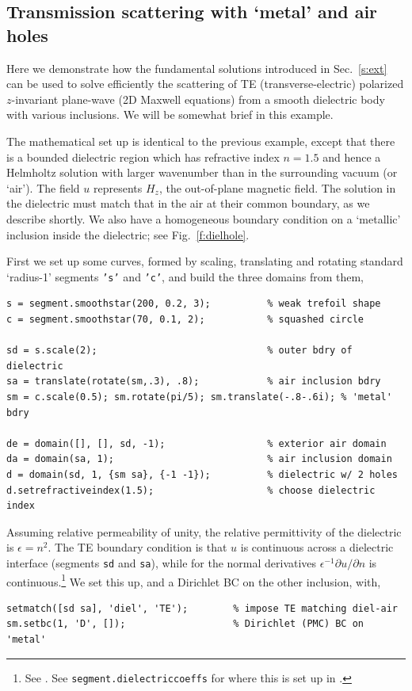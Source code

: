 \subsection{Transmission scattering with `metal' and air holes}
\label{s:dielhole}

Here we demonstrate how the fundamental solutions introduced in
Sec.~\ref{s:ext} can be used to solve efficiently
the scattering of TE (transverse-electric) polarized $z$-invariant
plane-wave (2D Maxwell equations) from a smooth dielectric body with various
inclusions. We will be somewhat brief in this example.

The mathematical set up is identical to the previous example, except that
there is a bounded dielectric region which has refractive index $n = 1.5$ and
hence a Helmholtz solution with
larger wavenumber than in the surrounding vacuum (or `air').
The field $u$ represents $H_z$, the out-of-plane magnetic field.
The solution in the dielectric must match that in the air at their common
boundary, as we describe shortly. We also have a homogeneous boundary condition
on a `metallic' inclusion inside the dielectric; see Fig.~\ref{f:dielhole}.

First we set up some curves, formed by scaling, translating and rotating
standard `radius-1' segments {\tt 's'} and {\tt 'c'}, and build the
three domains from them,
\begin{verbatim}
s = segment.smoothstar(200, 0.2, 3);          % weak trefoil shape
c = segment.smoothstar(70, 0.1, 2);           % squashed circle

sd = s.scale(2);                              % outer bdry of dielectric
sa = translate(rotate(sm,.3), .8);            % air inclusion bdry
sm = c.scale(0.5); sm.rotate(pi/5); sm.translate(-.8-.6i); % 'metal' bdry

de = domain([], [], sd, -1);                  % exterior air domain
da = domain(sa, 1);                           % air inclusion domain
d = domain(sd, 1, {sm sa}, {-1 -1});          % dielectric w/ 2 holes
d.setrefractiveindex(1.5);                    % choose dielectric index
\end{verbatim}

Assuming relative permeability of unity, the relative
permittivity of the dielectric is $\epsilon = n^2$.
The TE boundary condition is that $u$ is continuous
across a dielectric interface (segments {\tt sd} and {\tt sa}),
while for the normal derivatives $\epsilon^{-1} \partial u/\partial n$ is
continuous.\footnote{See \cite{jackson}.
See {\tt segment.dielectriccoeffs} for where this
is set up in \mpspack.}
We set this up, and a Dirichlet BC on the other inclusion, with,
\begin{verbatim}
setmatch([sd sa], 'diel', 'TE');        % impose TE matching diel-air
sm.setbc(1, 'D', []);                   % Dirichlet (PMC) BC on 'metal'
\end{verbatim}

